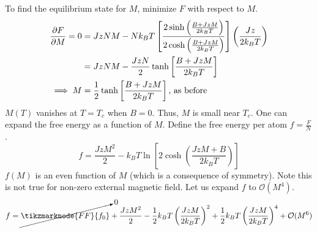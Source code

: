 \documentclass[12pt,a4paper,titlepage]{article}
\newcommand{\trm}[1]{\textrm{#1}} %
\begin{document}
To find the equilibrium state for $M$, minimize $F$ with respect to $M$.
\begin{equation}
\begin{aligned}
\pdv{F}{M}=0&=JzNM-Nk_{B}T\left[\frac{2\sinh\left(\frac{B+JzM}{2k_{B}T}\right)}{2\cosh\left(\frac{B+JzM}{2k_{B}T}\right)}\right]\left(\frac{Jz}{2k_{B}T}\right)\\
&=JzNM-\frac{JzN}{2}\tanh\left[\frac{B+JzM}{2k_{B}T}\right]\\
\implies M&=\frac{1}{2}\tanh\left[\frac{B+JzM}{2k_{B}T}\right]\trm{, as before}
\end{aligned}
\end{equation}
$M(T)$ vanishes at $T=T_{c}$ when $B=0$. Thus, $M$ is small near $T_{c}$. One can expand the free energy as a function of $M$. Define the free energy per atom $f=\frac{F}{N}$.
\begin{equation}
f=\frac{JzM^{2}}{2}-k_{B}T\ln{\left[2\cosh\left(\frac{JzM+B}{2k_{B}T}\right)\right]}
\end{equation}
$f(M)$ is an even function of $M$ (which is a consequence of symmetry). Note this is not true for non-zero external magnetic field. Let us expand $f$ to $\mathcal{O}(M^{4})$.
\newpage
\begin{equation}
f=\cancelto{0}{\tikzmarknode{FF}{f_{0}}}+\frac{JzM^{2}}{2}-\frac{1}{2}k_{B}T\left(\frac{JzM}{2k_{B}T}\right)^{2}+\frac{1}{2}k_{B}T\left(\frac{JzM}{2k_{B}T}\right)^{4}+\mathcal{O}(M^{6})
\end{equation}

\vspace{1cm}
\end{document}
